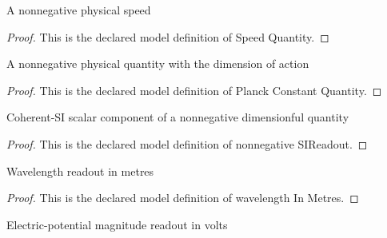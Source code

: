 \begin{definition}
  \label{def:physics:phyx-mini-0612:phyxminiproblems-problemphyxmini0612-speedquantity}
  A nonnegative physical speed
\end{definition}
\begin{proof}
  This is the declared model definition of Speed Quantity.
\end{proof}
\begin{definition}
  \label{def:physics:phyx-mini-0612:phyxminiproblems-problemphyxmini0612-planckconstantquantity}
  A nonnegative physical quantity with the dimension of action
\end{definition}
\begin{proof}
  This is the declared model definition of Planck Constant Quantity.
\end{proof}
\begin{definition}
  \label{def:physics:phyx-mini-0612:phyxminiproblems-problemphyxmini0612-nonnegativesireadout}
  Coherent-SI scalar component of a nonnegative dimensionful quantity
\end{definition}
\begin{proof}
  This is the declared model definition of nonnegative SIReadout.
\end{proof}
\begin{definition}
  \label{def:physics:phyx-mini-0612:phyxminiproblems-problemphyxmini0612-wavelengthinmetres}
  Wavelength readout in metres
\end{definition}
\begin{proof}
  This is the declared model definition of wavelength In Metres.
\end{proof}
\begin{definition}
  \label{def:physics:phyx-mini-0612:phyxminiproblems-problemphyxmini0612-potentialinvolts}
  Electric-potential magnitude readout in volts
\end{definition}
